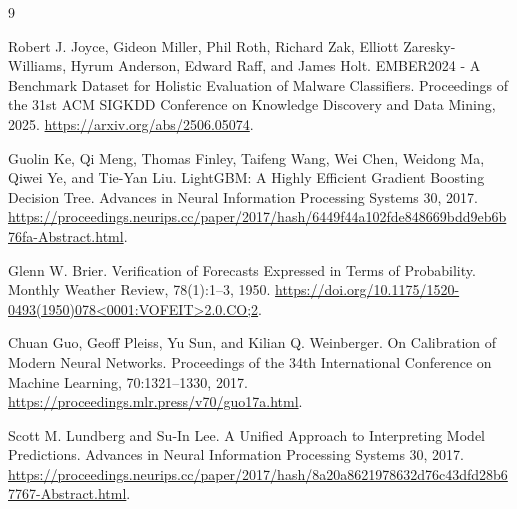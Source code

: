 \documentclass[11pt]{article}
\begin{document}
\begin{thebibliography}{9}

Robert J. Joyce, Gideon Miller, Phil Roth, Richard Zak, Elliott
Zaresky-Williams, Hyrum Anderson, Edward Raff, and James Holt.
\newblock EMBER2024 - A Benchmark Dataset for Holistic Evaluation of Malware
Classifiers.
\newblock Proceedings of the 31st ACM SIGKDD Conference on Knowledge Discovery
and Data Mining, 2025.
\newblock \url{https://arxiv.org/abs/2506.05074}.

Guolin Ke, Qi Meng, Thomas Finley, Taifeng Wang, Wei Chen, Weidong Ma, Qiwei Ye,
and Tie-Yan Liu.
\newblock LightGBM: A Highly Efficient Gradient Boosting Decision Tree.
\newblock Advances in Neural Information Processing Systems 30, 2017.
\newblock \url{https://proceedings.neurips.cc/paper/2017/hash/6449f44a102fde848669bdd9eb6b76fa-Abstract.html}.

Glenn W. Brier.
\newblock Verification of Forecasts Expressed in Terms of Probability.
\newblock Monthly Weather Review, 78(1):1--3, 1950.
\newblock \url{https://doi.org/10.1175/1520-0493(1950)078<0001:VOFEIT>2.0.CO;2}.

Chuan Guo, Geoff Pleiss, Yu Sun, and Kilian Q. Weinberger.
\newblock On Calibration of Modern Neural Networks.
\newblock Proceedings of the 34th International Conference on Machine Learning,
70:1321--1330, 2017.
\newblock \url{https://proceedings.mlr.press/v70/guo17a.html}.

Scott M. Lundberg and Su-In Lee.
\newblock A Unified Approach to Interpreting Model Predictions.
\newblock Advances in Neural Information Processing Systems 30, 2017.
\newblock \url{https://proceedings.neurips.cc/paper/2017/hash/8a20a8621978632d76c43dfd28b67767-Abstract.html}.

\end{thebibliography}
\end{document}
